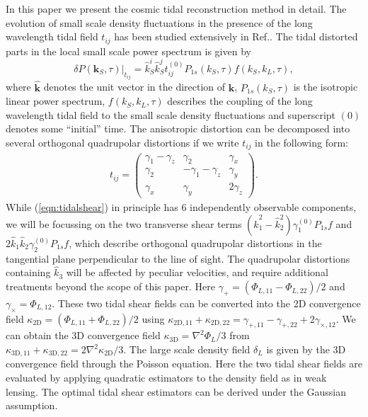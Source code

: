 \documentclass[aps,prd,twocolumn,showpacs,superscriptaddress,groupedaddress,nofootinbib]{revtex4}  %
\newcommand{\mr}{\mathrm}
\begin{document}
In this paper we present the cosmic tidal reconstruction method in detail. 
The evolution of small scale density fluctuations in the presence of the 
long wavelength tidal field $t_{ij}$ has been studied extensively in 
Ref.\cite{2014:tidal}.
The tidal distorted parts in the local small scale power spectrum is given by 
\begin{equation}
\delta P(\bm{k}_S,\tau)|_{t_{ij}}=
\hat{k}_S^i\hat{k}_S^jt_{ij}^{(0)}P_{1s}(k_S,\tau)f(k_S, k_L,\tau),
\end{equation}
where $\hat{\bm{k}}$ denotes the unit vector in the direction of $\bm{k}$,
$P_{1s}(k_S,\tau)$ is the isotropic linear power spectrum, 
$f(k_S, k_L, \tau)$ describes the coupling of the long wavelength tidal field 
to the small scale density fluctuations and superscript $(0)$ denotes some 
``initial'' time. 
The anisotropic distortion can be decomposed into several orthogonal quadrupolar
distortions if we write $t_{ij}$ in the following form:
\begin{eqnarray}
t_{ij}=\left( \begin{array}{ccc}
\gamma_{1}-\gamma_{z} & \gamma_{2} & \gamma_{x}\\
\gamma_{2} & -\gamma_{1}-\gamma_{z} & \gamma_{y}\\
\gamma_{x} & \gamma_{y} & 2\gamma_z
\end{array} \right).
\label{eqn:tidalshear}
\end{eqnarray}
While (\ref{eqn:tidalshear}) in principle has 6 independently observable components,
we will be focussing on  the
two transverse shear terms 
$(\hat{k}_1^2-\hat{k}_2^2)\gamma_1^{(0)}P_{1s}f$
and $2\hat{k}_1\hat{k}_2\gamma_2^{(0)}P_{1s}f$, which 
describe orthogonal quadrupolar distortions in the tangential plane perpendicular 
to the line of sight.  The quadrupolar distortions containing $\hat{k}_3$
will be affected by peculiar velocities, and require additional treatments beyond the
scope of this paper.
Here $\gamma_{+}=(\Phi_{L,11}-\Phi_{L,22})/2$ and $\gamma_{\times}=\Phi_{L,12}$.
These two tidal shear fields can be converted into the 2D convergence field
$\kappa_\mr{2D}=(\Phi_{L,11}+\Phi_{L,22})/2$ 
using $\kappa_{\mr{2D},11}+\kappa_{\mr{2D},22}=
\gamma_{+,11}-\gamma_{+,22}+2\gamma_{\times,12}$.
We can obtain the 3D convergence field $\kappa_\mr{3D}=\nabla^2\Phi_L/3$ from 
$\kappa_\mr{3D,11}+\kappa_\mr{3D,22}=2\nabla^2\kappa_\mr{2D}/3$. 
The large scale density field $\delta_L$ is given by the 3D convergence field 
through the Poisson equation.
Here the two tidal shear fields are evaluated by applying
quadratic estimators to the density field as in weak lensing.
The optimal tidal shear estimators can be derived under the Gaussian assumption.
\end{document}
